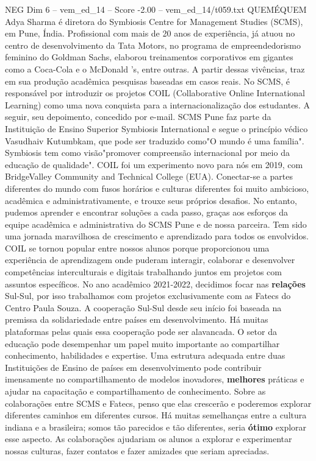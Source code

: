 \begin{textsample}{NEG Dim 6 – vem\_ed\_14 – Score -2.00 – vem\_ed\_14/t059.txt}  \label{ex:f6_neg_076}
QUEMÉQUEM Adya Sharma é diretora do Symbiosis Centre for Management Studies (SCMS), em Pune, Índia.
Profissional com mais de 20 anos de experiência, já atuou no centro de desenvolvimento da Tata Motors, no programa de empreendedorismo feminino do Goldman Sachs, elaborou treinamentos corporativos em gigantes como a Coca-Cola e o McDonald 's, entre outras.
A partir dessas vivências, traz em sua produção acadêmica pesquisas baseadas em casos reais.
No SCMS, é responsável por introduzir os projetos COIL (Collaborative Online International Learning) como uma nova conquista para a internacionalização dos estudantes.
A seguir, seu depoimento, concedido por e-mail.
SCMS Pune faz parte da Instituição de Ensino Superior Symbiosis International e segue o princípio védico Vasudhaiv Kutumbkam, que pode ser traduzido como"O mundo é uma família".
Symbiosis tem como visão"promover compreensão internacional por meio da educação de qualidade".
COIL foi um experimento novo para nós em 2019, com BridgeValley Community and Technical College (EUA).
Conectar-se a partes diferentes do mundo com fusos horários e culturas diferentes foi muito ambicioso, acadêmica e administrativamente, e trouxe seus próprios desafios.
No entanto, pudemos aprender e encontrar soluções a cada passo, graças aos esforços da equipe acadêmica e administrativa do SCMS Pune e de nossa parceira.
Tem sido uma jornada maravilhosa de crescimento e aprendizado para todos os envolvidos.
COIL se tornou popular entre nossos alunos porque proporcionou uma experiência de aprendizagem onde puderam interagir, colaborar e desenvolver competências interculturais e digitais trabalhando juntos em projetos com assuntos específicos.
No ano acadêmico 2021-2022, decidimos focar nas \textbf{relações} Sul-Sul, por isso trabalhamos com projetos exclusivamente com as Fatecs do Centro Paula Souza.
A cooperação Sul-Sul desde seu início foi baseada na premissa da solidariedade entre países em desenvolvimento.
Há muitas plataformas pelas quais essa cooperação pode ser alavancada.
O setor da educação pode desempenhar um papel muito importante ao compartilhar conhecimento, habilidades e expertise.
Uma estrutura adequada entre duas Instituições de Ensino de países em desenvolvimento pode contribuir imensamente no compartilhamento de modelos inovadores, \textbf{melhores} práticas e ajudar na capacitação e compartilhamento de conhecimento.
Sobre as colaborações entre SCMS e Fatecs, penso que elas crescerão e poderemos explorar diferentes caminhos em diferentes cursos.
Há muitas semelhanças entre a cultura indiana e a brasileira; somos tão parecidos e tão diferentes, seria \textbf{ótimo} explorar esse aspecto.
As colaborações ajudariam os alunos a explorar e experimentar nossas culturas, fazer contatos e fazer amizades que seriam apreciadas.

\end{textsample}
